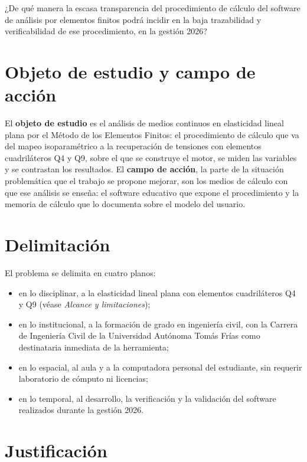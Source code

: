¿De qué manera la escasa transparencia del procedimiento de cálculo del software de análisis por elementos finitos podrá incidir en la baja trazabilidad y verificabilidad de ese procedimiento, en la gestión 2026?

\section*{Objeto de estudio y campo de acción}

El \textbf{objeto de estudio} \autocite[p.~8]{alvarez_metodologia} es el análisis de medios continuos en elasticidad lineal plana por el Método de los Elementos Finitos: el procedimiento de cálculo que va del mapeo isoparamétrico a la recuperación de tensiones con elementos cuadriláteros Q4 y Q9, sobre el que se construye el motor, se miden las variables y se contrastan los resultados. El \textbf{campo de acción}, la parte de la situación problemática que el trabajo se propone mejorar, son los medios de cálculo con que ese análisis se enseña: el software educativo que expone el procedimiento y la memoria de cálculo que lo documenta sobre el modelo del usuario.

\section*{Delimitación}

El problema se delimita en cuatro planos:
\begin{itemize}
    \item en lo disciplinar, a la elasticidad lineal plana con elementos cuadriláteros Q4 y Q9 (véase \emph{Alcance y limitaciones});
    \item en lo institucional, a la formación de grado en ingeniería civil, con la Carrera de Ingeniería Civil de la Universidad Autónoma Tomás Frías como destinataria inmediata de la herramienta;
    \item en lo espacial, al aula y a la computadora personal del estudiante, sin requerir laboratorio de cómputo ni licencias;
    \item en lo temporal, al desarrollo, la verificación y la validación del software realizados durante la gestión 2026.
\end{itemize}

\section*{Justificación}

